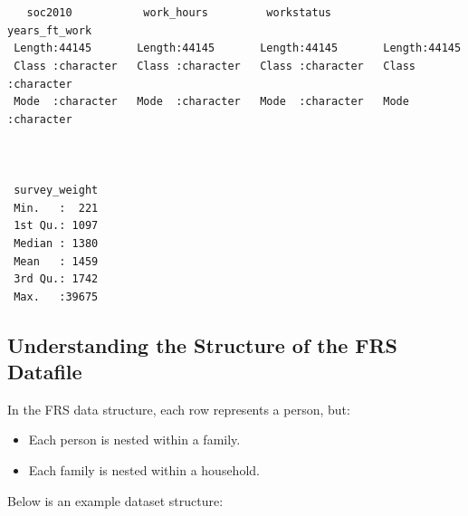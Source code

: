 \documentclass[
  letterpaper,
  DIV=11,
  numbers=noendperiod]{scrreprt}
\providecommand{\tightlist}{%
  \setlength{\itemsep}{0pt}\setlength{\parskip}{0pt}}
\begin{document}
\begin{verbatim}
                                                                            
                                                                            
   soc2010           work_hours         workstatus        years_ft_work     
 Length:44145       Length:44145       Length:44145       Length:44145      
 Class :character   Class :character   Class :character   Class :character  
 Mode  :character   Mode  :character   Mode  :character   Mode  :character  
                                                                            
                                                                            
                                                                            
 survey_weight  
 Min.   :  221  
 1st Qu.: 1097  
 Median : 1380  
 Mean   : 1459  
 3rd Qu.: 1742  
 Max.   :39675  
\end{verbatim}

\subsection{Understanding the Structure of the FRS
Datafile}\label{understanding-the-structure-of-the-frs-datafile}

In the FRS data structure, each row represents a person, but:

\begin{itemize}
\tightlist
\item
  Each person is nested within a family.
\item
  Each family is nested within a household.
\end{itemize}

Below is an example dataset structure:
\end{document}
